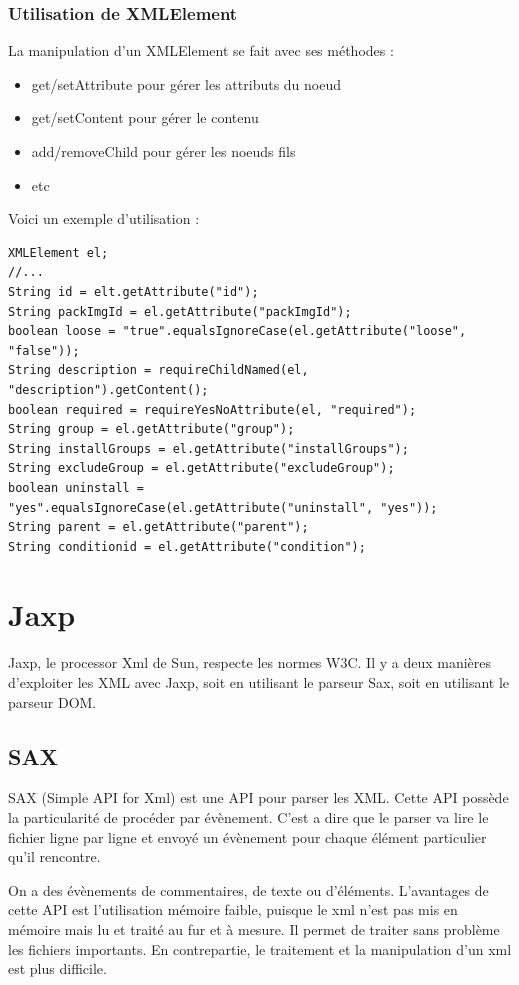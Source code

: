 \subsubsection{Utilisation de XMLElement}
La manipulation d'un XMLElement se fait avec ses méthodes :
\begin{itemize}
	\item get/setAttribute pour gérer les attributs du noeud
	\item get/setContent pour gérer le contenu
	\item add/removeChild pour gérer les noeuds fils
	\item etc
\end{itemize}

Voici un exemple d'utilisation :
\begin{lstlisting}
XMLElement el;
//...
String id = elt.getAttribute("id");
String packImgId = el.getAttribute("packImgId");
boolean loose = "true".equalsIgnoreCase(el.getAttribute("loose", "false"));
String description = requireChildNamed(el, "description").getContent();
boolean required = requireYesNoAttribute(el, "required");
String group = el.getAttribute("group");
String installGroups = el.getAttribute("installGroups");
String excludeGroup = el.getAttribute("excludeGroup");
boolean uninstall = "yes".equalsIgnoreCase(el.getAttribute("uninstall", "yes"));
String parent = el.getAttribute("parent");
String conditionid = el.getAttribute("condition");
\end{lstlisting}
\section{Jaxp}
Jaxp, le processor Xml de Sun, respecte les normes W3C.
Il y a deux manières d'exploiter les XML avec Jaxp, soit en utilisant le parseur Sax, soit en utilisant le parseur DOM.
\subsection{SAX}
SAX (Simple API for Xml) est une API pour parser les XML.
Cette API possède la particularité de procéder par évènement.
C'est a dire que le parser va lire le fichier ligne par ligne et envoyé un évènement pour chaque élément particulier qu'il rencontre.

On a des évènements de commentaires, de texte ou d'éléments.
L'avantages de cette API est l'utilisation mémoire faible, puisque le xml n'est pas mis en mémoire mais lu et traité au fur et à mesure.
Il permet de traiter sans problème les fichiers importants.
En contrepartie, le traitement et la manipulation d'un xml est plus difficile.
